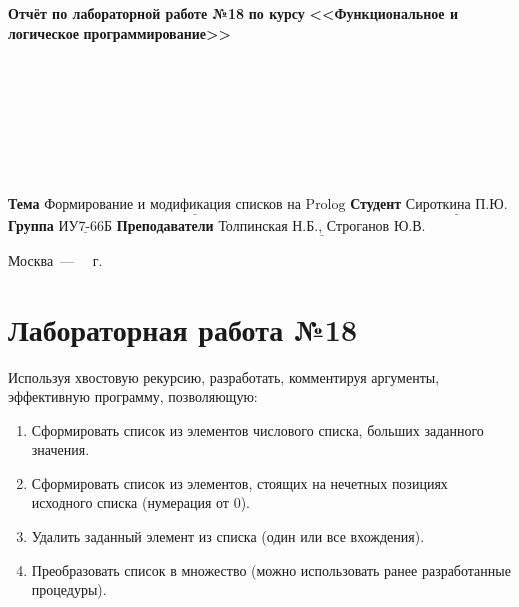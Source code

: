 \documentclass[12pt,a4paper]{scrreprt}
\begin{document}
\begin{titlepage}
		\begin{center}
			\noindent\begin{minipage}{1.3\textwidth}\centering
				\Large\textbf{  Отчёт по лабораторной работе №18}\newline
				\textbf{по курсу}\newline
				\textbf{<<Функциональное и логическое}\newline
				\textbf{\indent\indent\indent программирование>>}\newline
			\end{minipage}
		\end{center}
		
		~\\\\\\\\\\\\\\
		\normalsize
		\noindent\textbf{Тема } $\underline{\text{Формирование и модификация списков на Prolog}}$\newline\newline
		\noindent\textbf{Студент } $\underline{\text{Сироткина П.Ю.}}$\newline\newline
		\noindent\textbf{Группа } $\underline{\text{ИУ7-66Б}}$\newline\newline
		\noindent\textbf{Преподаватели } $\underline{\text{Толпинская Н.Б., Строганов Ю.В.}}$\newline
		
		\begin{center}
			\vfill
			Москва~---~\the\year
			~г.
		\end{center}
	\end{titlepage}
	
\chapter*{Лабораторная работа №18}

Используя хвостовую рекурсию, разработать, комментируя аргументы, эффективную программу, позволяющую:

\begin{enumerate}
	\item Сформировать список из элементов числового списка, больших заданного
	значения.
	\item Сформировать список из элементов, стоящих на нечетных позициях исходного
	списка (нумерация от 0).
	\item Удалить заданный элемент из списка (один или все вхождения).
	\item Преобразовать список в множество (можно использовать ранее разработанные
	процедуры).
\end{enumerate}
\end{document}
